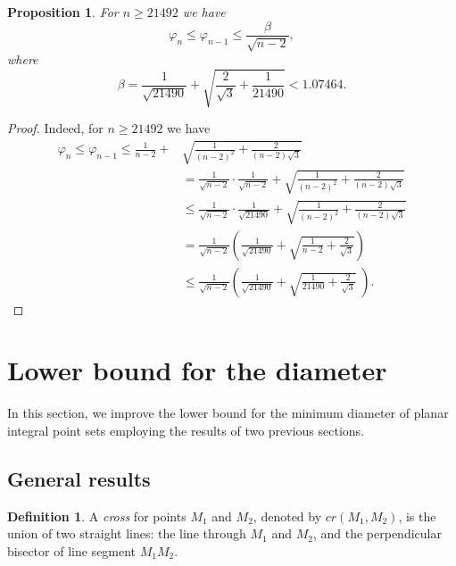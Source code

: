\documentclass[a4paper,14pt]{article} %
\theoremstyle{plain}
\newtheorem{proposition}[theorem]{Proposition}
\theoremstyle{definition}
\newtheorem{definition}[theorem]{Definition}
\begin{document}
\begin{proposition}
	\label{varphi_n_where_n_geq_21492}
	For $n \geq 21492$ we have
	\begin{equation}
		\varphi_n \leq \varphi_{n-1} \leq \frac{\beta}{\sqrt{n-2}}
		,
	\end{equation}
	where
	\begin{equation}
		\beta = \frac{1}{\sqrt{21490}} + \sqrt{ \frac{2}{\sqrt{3}} + \frac{1}{21490} } < 1.07464
		.
	\end{equation}
\end{proposition}

\begin{proof}
	Indeed, for $n \geq 21492$ we have
	\begin{align*}
		\varphi_n
		\leq
		\varphi_{n-1}
		\leq
		\frac{1}{n-2} +
		&
		\sqrt{
			\frac{1}{(n-2)^2}
			+
			\frac{2}{(n-2)\sqrt{3}}
		}
		\\&=
		\frac{1}{\sqrt{n-2}}
		\cdot
		\frac{1}{\sqrt{n-2}}
		 +
		\sqrt{
			\frac{1}{(n-2)^2}
			+
			\frac{2}{(n-2)\sqrt{3}}
		}
		\\&\leq
		\frac{1}{\sqrt{n-2}}
		\cdot
		\frac{1}{\sqrt{21490}}
		 +
		\sqrt{
			\frac{1}{(n-2)^2}
			+
			\frac{2}{(n-2)\sqrt{3}}
		}
		\\&=
		\frac{1}{\sqrt{n-2}}
		\left(
		\frac{1}{\sqrt{21490}}
		 +
		\sqrt{
			\frac{1}{n-2}
			+
			\frac{2}{\sqrt{3}}
		}
		\right)
		\\&\leq
		\frac{1}{\sqrt{n-2}}
		\left(
		\frac{1}{\sqrt{21490}}
		 +
		\sqrt{
			\frac{1}{21490}
			+
			\frac{2}{\sqrt{3}}
		}
		\;
		\right)
		.
	\end{align*}
\end{proof}

\section{Lower bound for the diameter}

In this section,
we improve the lower bound for the minimum diameter of planar integral point sets
employing the results of two previous sections.

\subsection{General results}

\begin{definition}
	A \textit{cross} for points $M_1$ and $M_2$, denoted by $cr(M_1,M_2)$, is the union of two straight lines:
	the line through $M_1$ and $M_2$,
	and the perpendicular bisector of line segment $M_1 M_2$.
\end{definition}
\end{document}
